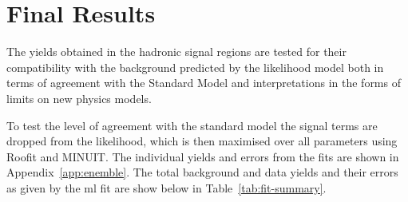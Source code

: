 \section{Final Results} %
\label{sec:final_results}
The yields obtained in the hadronic signal regions are tested for their 
compatibility with the background predicted by the likelihood model both in 
terms of agreement with the Standard Model and interpretations in the forms of 
limits on new physics models.

To test the level of agreement with the standard model the signal terms are 
dropped from the likelihood, which is then maximised over all parameters using 
Roofit\cite{ROOSTATS} and MINUIT\cite{MINOS}. The individual yields and errors from the fits are shown in Appendix~\ref{app:enemble}. The total background and data yields and their errors as given by the \ac{ml} fit are show below in Table~\ref{tab:fit-summary}.

